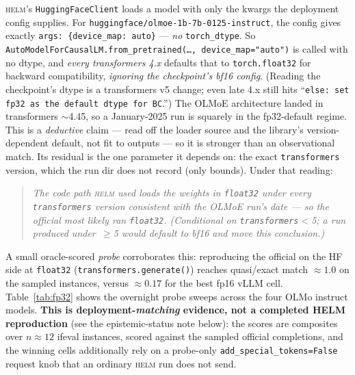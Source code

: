 \documentclass[11pt]{report}
\newcommand{\code}[1]{\texttt{#1}}
\begin{document}
\textsc{helm}'s \code{HuggingFaceClient} loads a model with only the kwargs the
deployment config supplies. For \code{huggingface/olmoe-1b-7b-0125-instruct}, the
config gives exactly \code{args: \{device\_map: auto\}} --- \emph{no}
\code{torch\_dtype}. So \code{AutoModelForCausalLM.from\_pretrained(\ldots,
device\_map="auto")} is called with no dtype, and \emph{every transformers 4.x}
defaults that to \code{torch.float32} for backward compatibility, \emph{ignoring
the checkpoint's bf16 config}. (Reading the checkpoint's dtype is a transformers
v5 change; even late 4.x still hits ``\code{else: set fp32 as the default dtype for
BC}.'') The OLMoE architecture landed in transformers $\sim$4.45, so a January-2025
run is squarely in the fp32-default regime. This is a \emph{deductive} claim ---
read off the loader source and the library's version-dependent default, not fit to
outputs --- so it is stronger than an observational match. Its residual is the one
parameter it depends on: the exact \code{transformers} version, which the run dir
does not record (only bounds). Under that reading:

\begin{quote}\itshape
The code path \textsc{helm} used loads the weights in \code{float32} under every
\code{transformers} version consistent with the OLMoE run's date --- so the
official most likely ran \code{float32}. (Conditional on \code{transformers}$<$5;
a run produced under \,$\geq$5 would default to bf16 and move this conclusion.)
\end{quote}

A small oracle-scored \emph{probe} corroborates this: reproducing the official on
the HF side at \code{float32} (\code{transformers.generate()}) reaches quasi/exact
match $\approx 1.0$ on the sampled instances, versus $\approx 0.17$ for the best
fp16 vLLM cell. Table~\ref{tab:fp32} shows the overnight probe sweeps across the
four OLMo instruct models. \textbf{This is deployment-\emph{matching} evidence, not
a completed HELM reproduction} (see the epistemic-status note below): the scores are
composites over $n\approx12$ ifeval instances, scored against the sampled official
completions, and the winning cells additionally rely on a probe-only
\code{add\_special\_tokens=False} request knob that an ordinary \textsc{helm} run
does not send.
\end{document}
